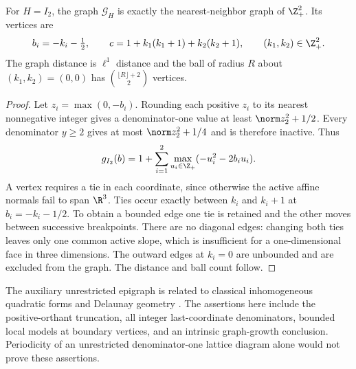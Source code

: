 \begin{corollary}\label{cor:grid}
For $H=I_2$, the graph $\mathscr G_H$ is exactly the nearest-neighbor graph of $\Z_+^2$. Its vertices are
\[
 b_i=-k_i-\tfrac12,\qquad c=1+k_1(k_1+1)+k_2(k_2+1),
 \qquad(k_1,k_2)\in\Z_+^2.
\]
The graph distance is $\ell^1$ distance and the ball of radius $R$ about $(k_1,k_2)=(0,0)$ has $\binom{\lfloor R\rfloor+2}{2}$ vertices.
\end{corollary}
\begin{proof}
Let $z_i=\max(0,-b_i)$. Rounding each positive $z_i$ to its nearest nonnegative integer gives a denominator-one value at least $\norm z_2^2+1/2$. Every denominator $y\ge2$ gives at most $\norm z_2^2+1/4$ and is therefore inactive. Thus
\[
 g_{I_2}(b)=1+\sum_{i=1}^2\max_{u_i\in\Z_+}(-u_i^2-2b_i u_i).
\]
A vertex requires a tie in each coordinate, since otherwise the active affine normals fail to span $\R^3$. Ties occur exactly between $k_i$ and $k_i+1$ at $b_i=-k_i-1/2$. To obtain a bounded edge one tie is retained and the other moves between successive breakpoints. There are no diagonal edges: changing both ties leaves only one common active slope, which is insufficient for a one-dimensional face in three dimensions. The outward edges at $k_i=0$ are unbounded and are excluded from the graph. The distance and ball count follow.
\end{proof}

The auxiliary unrestricted epigraph is related to classical inhomogeneous quadratic forms and Delaunay geometry \cite{Erdahl,IE}. The assertions here include the positive-orthant truncation, all integer last-coordinate denominators, bounded local models at boundary vertices, and an intrinsic graph-growth conclusion. Periodicity of an unrestricted denominator-one lattice diagram alone would not prove these assertions.

